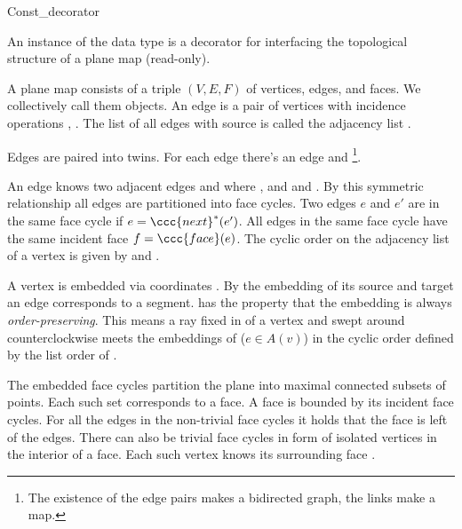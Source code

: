 
\begin{ccRefClass}{Const_decorator}


\ccDefinition

An instance  of the data type  is a 
decorator for interfacing the topological structure of a plane map  
(read-only).

A plane map  consists of a triple $(V, E, F)$ of vertices,
edges, and faces. We collectively call them objects. An edge 
is a pair of vertices  with incidence operations , . The list of all edges with source
 is called the adjacency list .

Edges are paired into twins. For each edge  there's an
edge  and \footnote{The
existence of the edge pairs makes  a bidirected graph, the
 links make  a map.}.

An edge  knows two adjacent edges 
and  where ,
 and  and . By this symmetric  relationship all edges are
partitioned into face cycles.  Two edges $e$ and $e'$ are in the same
face cycle if $e = \ccc{next}^*(e')$.  All edges  in the same
face cycle have the same incident face $f = \ccc{face}(e)$. The cyclic
order on the adjacency list of a vertex  is given
by  and
.

A vertex  is embedded via coordinates . By the
embedding of its source and target an edge corresponds to a
segment.  has the property that the embedding is always
\emph{order-preserving}.  This means a ray fixed in  of
a vertex  and swept around counterclockwise meets the
embeddings of  ($e \in A(v)$) in the cyclic order
defined by the list order of .

The embedded face cycles partition the plane into maximal connected
subsets of points. Each such set corresponds to a face. A face is
bounded by its incident face cycles. For all the edges in the
non-trivial face cycles it holds that the face is left of the edges.
There can also be trivial face cycles in form of isolated vertices in
the interior of a face. Each such vertex  knows its surrounding
face . 


\end{ccRefClass}
